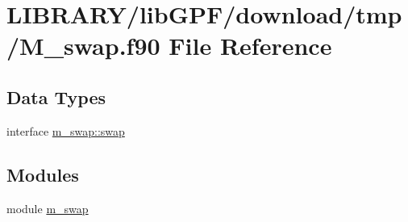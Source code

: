 \hypertarget{M__swap_8f90}{}\section{L\+I\+B\+R\+A\+R\+Y/lib\+G\+P\+F/download/tmp/\+M\+\_\+swap.f90 File Reference}
\label{M__swap_8f90}
\subsection*{Data Types}
\begin{DoxyCompactItemize}
\item 
interface \hyperlink{interfacem__swap_1_1swap}{m\+\_\+swap\+::swap}
\end{DoxyCompactItemize}
\subsection*{Modules}
\begin{DoxyCompactItemize}
\item 
module \hyperlink{namespacem__swap}{m\+\_\+swap}
\end{DoxyCompactItemize}
